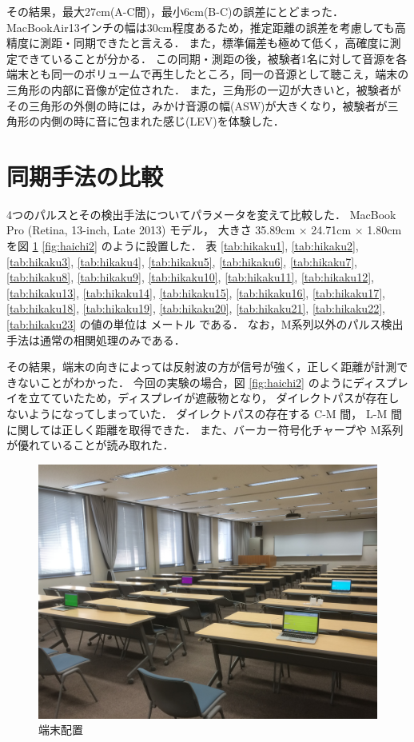 その結果，最大27cm(A-C間)，最小6cm(B-C)の誤差にとどまった．
MacBookAir13インチの幅は30cm程度あるため，推定距離の誤差を考慮しても高精度に測距・同期できたと言える．
また，標準偏差も極めて低く，高確度に測定できていることが分かる．
この同期・測距の後，被験者1名に対して音源を各端末とも同一のボリュームで再生したところ，同一の音源として聴こえ，端末の三角形の内部に音像が定位された．
また，三角形の一辺が大きいと，被験者がその三角形の外側の時には，みかけ音源の幅(ASW)が大きくなり，被験者が三角形の内側の時に音に包まれた感じ(LEV)を体験した．


\clearpage

\section{同期手法の比較}

4つのパルスとその検出手法についてパラメータを変えて比較した．
MacBook Pro (Retina, 13-inch, Late 2013) モデル，
大きさ 35.89cm × 24.71cm × 1.80cm を図 \ref{fig:haichi1} \ref{fig:haichi2} のように設置した．
表
\ref{tab:hikaku1},
\ref{tab:hikaku2},
\ref{tab:hikaku3},
\ref{tab:hikaku4},
\ref{tab:hikaku5},
\ref{tab:hikaku6},
\ref{tab:hikaku7},
\ref{tab:hikaku8},
\ref{tab:hikaku9},
\ref{tab:hikaku10},
\ref{tab:hikaku11},
\ref{tab:hikaku12},
\ref{tab:hikaku13},
\ref{tab:hikaku14},
\ref{tab:hikaku15},
\ref{tab:hikaku16},
\ref{tab:hikaku17},
\ref{tab:hikaku18},
\ref{tab:hikaku19},
\ref{tab:hikaku20},
\ref{tab:hikaku21},
\ref{tab:hikaku22},
\ref{tab:hikaku23}
の値の単位は メートル である．
なお，M系列以外のパルス検出手法は通常の相関処理のみである．

その結果，端末の向きによっては反射波の方が信号が強く，正しく距離が計測できないことがわかった．
今回の実験の場合，図 \ref{fig:haichi2} のようにディスプレイを立てていたため，ディスプレイが遮蔽物となり，
ダイレクトパスが存在しないようになってしまっていた．
ダイレクトパスの存在する C-M 間， L-M 間に関しては正しく距離を取得できた．
また、バーカー符号化チャープや M系列が優れていることが読み取れた．

\begin{figure}[p]
  \centering
  \includegraphics[clip,width=1.05\hsize]{img/haichi1.jpg}
  \caption{端末配置}\label{fig:haichi1}
\end{figure}

